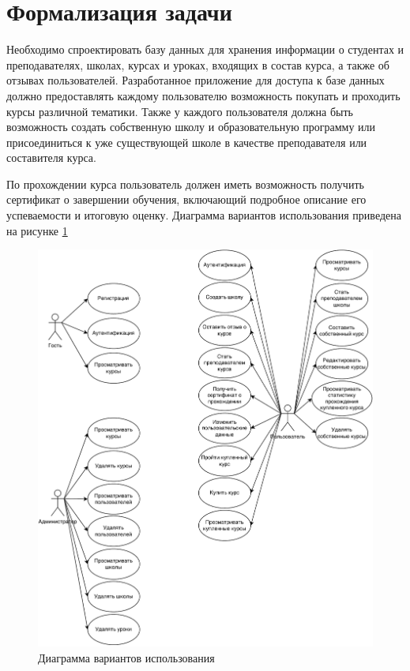 \section{Формализация задачи}
Необходимо спроектировать базу данных для хранения информации о студентах и преподавателях, школах, курсах и уроках, входящих в состав курса, а также об отзывах пользователей.
Разработанное приложение для доступа к базе данных должно предоставлять каждому пользователю возможность покупать и проходить курсы различной тематики. Также у каждого пользователя должна быть возможность создать собственную школу и образовательную программу
или присоединиться к уже существующей школе в качестве преподавателя или составителя курса.

По прохождении курса пользователь должен иметь возможность получить сертификат о завершении обучения,
включающий подробное описание его успеваемости и итоговую оценку. Диаграмма вариантов использования приведена на рисунке \ref{img:usecase}

\begin{figure}[H]
	\centering
	\includegraphics[height=0.7\textheight]{inc/img/usecase.pdf}
	\caption{Диаграмма вариантов использования}
	\label{img:usecase}
\end{figure}

